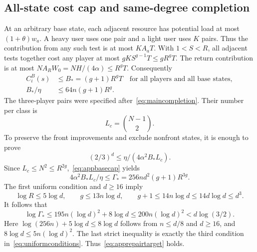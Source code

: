 \documentclass[11pt]{article}
\theoremstyle{definition}
\begin{document}
\subsection{All-state cost cap and same-degree completion}\label{app:samedegree}
At an arbitrary base state, each adjacent resource has potential load at most $(1+\theta)w_a$. A heavy user uses one pair and a light user uses $K$ pairs. Thus the contribution from any such test is at most $KA_aT$. With $1<S<R$, all adjacent tests together cost any player at most $gKS^{g-1}T\le gR^gT$. The return contribution is at most $NA_RW_0=NH/(4\alpha)\le R^gT$. Consequently
\begin{equation}\label{eq:appbasecap}
 \begin{aligned}
 C_i^B(s)&\le B_*=(g+1)R^gT\quad\text{for all players and all base states},\\
 B_*/\eta&\le64n(g+1)R^g.
 \end{aligned}
\end{equation}
The three-player pairs were specified after~\eqref{eq:maincompletion}. Their number per class is
\begin{equation}\label{eq:appclocks}
 L_c=\binom{N-1}{2}.
\end{equation}
To preserve the front improvements and exclude nonfront states, it is enough to prove
\begin{equation}\label{eq:apprepairtarget}
 (2/3)^d\le\eta/(4\alpha^2B_*L_c).
\end{equation}
Since $L_c\le N^2\le R^{2g}$,~\eqref{eq:appbasecap} yields
\begin{equation}\label{eq:appGamma}
 4\alpha^2B_*L_c/\eta\le
 \Gamma_*=256nd^2(g+1)R^{3g}.
\end{equation}
The first uniform condition and $d\ge16$ imply
\[
 \log R\le5\log d,\qquad g\le13n\log d,\qquad
 g+1\le14n\log d\le14d\log d\le d^3.
\]
It follows that
\begin{equation}\label{eq:appGammalog}
 \log\Gamma_*\le195n(\log d)^2+8\log d
 \le200n(\log d)^2<d\log(3/2).
\end{equation}
Here $\log(256n)+5\log d\le8\log d$ follows from $n\le d/8$ and $d\ge16$, and $8\log d\le5n(\log d)^2$. The last strict inequality is exactly the third condition in~\eqref{eq:uniformconditions}. Thus~\eqref{eq:apprepairtarget} holds.
\end{document}
